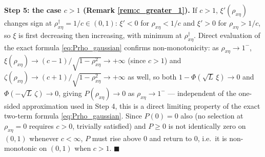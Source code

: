 \textbf{Step 5: the case $c>1$ (Remark \ref{rem:c_greater_1}).} If $c>1$, $\xi'(\rho_{x\eta})$ changes
sign at $\rho_{x\eta}^\dagger=1/c\in(0,1)$: $\xi'<0$ for $\rho_{x\eta}<1/c$ and $\xi'>0$ for
$\rho_{x\eta}>1/c$, so $\xi$ is first decreasing then increasing, with minimum at $\rho_{x\eta}^\dagger$.
Direct evaluation of the exact formula \eqref{eq:Prho_gaussian} confirms non-monotonicity: as
$\rho_{x\eta}\to1^-$, $\xi(\rho_{x\eta})\to(c-1)/\sqrt{1-\rho_{x\eta}^2}\to+\infty$ (since $c>1$) and
$\zeta(\rho_{x\eta})\to(c+1)/\sqrt{1-\rho_{x\eta}^2}\to+\infty$ as well, so both
$1-\Phi(\sqrt L\,\xi)\to0$ and $\Phi(-\sqrt L\,\zeta)\to0$, giving $P(\rho_{x\eta})\to0$ as
$\rho_{x\eta}\to1^-$ — independent of the one-sided approximation used in Step 4, this is a direct
limiting property of the exact two-term formula \eqref{eq:Prho_gaussian}. Since $P(0)=0$ also (no
selection at $\rho_{x\eta}=0$ requires $c>0$, trivially satisfied) and $P\geq0$ is not identically zero
on $(0,1)$ whenever $c<\infty$, $P$ must rise above $0$ and return to $0$, i.e.\ it is non-monotonic on
$(0,1)$ when $c>1$. $\blacksquare$

